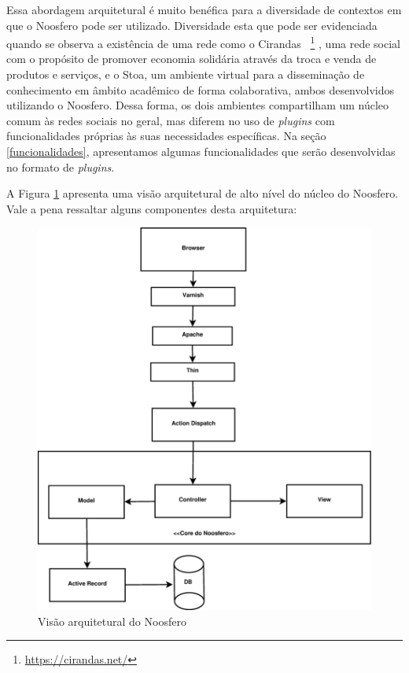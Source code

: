 Essa abordagem arquitetural é muito benéfica para a diversidade de contextos
em que o Noosfero pode ser utilizado. Diversidade esta que pode ser evidenciada
quando se observa a existência de uma rede como o Cirandas
~\footnote{\url{https://cirandas.net/}}
, uma rede social com o propósito de promover economia solidária através
da troca e venda de produtos e serviços, e o
Stoa, um ambiente virtual para a disseminação de conhecimento em âmbito
acadêmico de forma colaborativa, ambos desenvolvidos utilizando o Noosfero.
%
Dessa forma, os dois ambientes compartilham um núcleo comum às redes sociais
no geral, mas diferem no uso de \textit{plugins} com funcionalidades próprias
às suas necessidades específicas. Na seção \ref{funcionalidades}, apresentamos
algumas funcionalidades que serão desenvolvidas no formato de \textit{plugins}.



A Figura \ref{noosfero-arch} apresenta uma visão arquitetural de alto nível
do núcleo do Noosfero. Vale a pena ressaltar alguns componentes desta arquitetura:

\begin{figure}[h]
	\centering
	\includegraphics[keepaspectratio=true,scale=0.25]
	  {figuras/noosfero_architeture.eps}
	\caption{Visão arquitetural do Noosfero}
	\label{noosfero-arch}
\end{figure}

